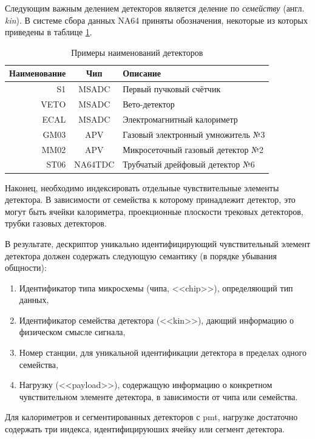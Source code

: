 Следующим важным делением детекторов является деление
по \emph{семейству} (англ. \emph{kin}). В системе сбора данных NA64
приняты обозначения, некоторые из которых приведены в
таблице \ref{tab:detector-names-examples}.

\begin{table}[ht]
\centering
\begin{tabular}{r|cl}
Наименование & Чип     & Описание \\ \hline
          S1 & MSADC   & Первый пучковый счётчик \\
        VETO & MSADC   & Вето-детектор \\
        ECAL & MSADC   & Электромагнитный калориметр \\
        GM03 & APV     & Газовый электронный умножитель №3 \\
        MM02 & APV     & Микросеточный газовый детектор №2  \\
        ST06 & NA64TDC & Трубчатый дрейфовый детектор №6
\end{tabular}
\caption{Примеры наименований детекторов}
\label{tab:detector-names-examples}
\end{table}

Наконец, необходимо индексировать отдельные чувствительные
элементы детектора. В зависимости от семейства к которому принадлежит
детектор, это могут быть ячейки калориметра, проекционные
плоскости трековых детекторов, трубки газовых детекторов.

В результате, дескриптор уникально идентифицирующий чувствительный
элемент детектора должен содержать следующую семантику (в порядке
убывания общности):

\begin{enumerate}
    \item Идентификатор типа микросхемы (чипа, <<chip>>), определяющий
    тип данных,
    \item Идентификатор семейства детектора (<<kin>>), дающий информацию о
    физическом смысле сигнала,
    \item Номер станции, для уникальной идентификации детектора в
    пределах одного семейства,
    \item Нагрузку (<<payload>>), содержащую информацию о конкретном
    чувствительном элементе детектора, в зависимости от чипа или семейства.
\end{enumerate}

Для калориметров и сегментированных детекторов с \acrshort{pmt},
нагрузке достаточно содержать три индекса, идентифицируюших
ячейку или сегмент детектора.

